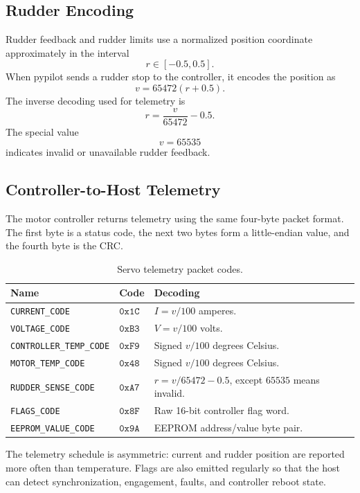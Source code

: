 \documentclass[10pt,twocolumn]{article}
\begin{document}
\subsection{Rudder Encoding}
Rudder feedback and rudder limits use a normalized position coordinate
approximately in the interval
\[
r \in [-0.5,0.5].
\]
When pypilot sends a rudder stop to the controller, it encodes the
position as
\[
v = 65472(r+0.5).
\]
The inverse decoding used for telemetry is
\[
r = \frac{v}{65472} - 0.5.
\]
The special value
\[
v = 65535
\]
indicates invalid or unavailable rudder feedback.
\subsection{Controller-to-Host Telemetry}
The motor controller returns telemetry using the same four-byte packet
format.  The first byte is a status code, the next two bytes form a
little-endian value, and the fourth byte is the CRC.
\begin{table}[!t]
\centering
\caption{Servo telemetry packet codes.}
\label{tab:pypilot-servo-telemetry}
\begin{tabularx}{\columnwidth}{Z{0.42\columnwidth}Z{0.17\columnwidth}Y}
\toprule
Name & Code & Decoding \\
\midrule
\texttt{CURRENT\_CODE} &
\(\mathtt{0x1C}\) &
\(I = v/100\) amperes. \\
\texttt{VOLTAGE\_CODE} &
\(\mathtt{0xB3}\) &
\(V = v/100\) volts. \\
\texttt{CONTROLLER\_TEMP\_CODE} &
\(\mathtt{0xF9}\) &
Signed \(v/100\) degrees Celsius. \\
\texttt{MOTOR\_TEMP\_CODE} &
\(\mathtt{0x48}\) &
Signed \(v/100\) degrees Celsius. \\
\texttt{RUDDER\_SENSE\_CODE} &
\(\mathtt{0xA7}\) &
\(r = v/65472 - 0.5\), except \(65535\) means invalid. \\
\texttt{FLAGS\_CODE} &
\(\mathtt{0x8F}\) &
Raw 16-bit controller flag word. \\
\texttt{EEPROM\_VALUE\_CODE} &
\(\mathtt{0x9A}\) &
EEPROM address/value byte pair. \\
\bottomrule
\end{tabularx}
\end{table}
The telemetry schedule is asymmetric: current and rudder position are
reported more often than temperature.  Flags are also emitted regularly
so that the host can detect synchronization, engagement, faults, and
controller reboot state.
\end{document}
